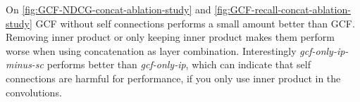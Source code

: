 On \autoref{fig:GCF-NDCG-concat-ablation-study} and \autoref{fig:GCF-recall-concat-ablation-study} GCF without self connections performs a small amount better than GCF.
Removing inner product or only keeping inner product makes them perform worse when using concatenation as layer combination.
Interestingly \textit{gcf-only-ip-minus-sc} performs better than \textit{gcf-only-ip}, which can indicate that self connections are harmful for performance, if you only use inner product in the convolutions.
